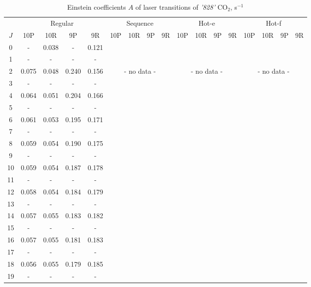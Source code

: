 \documentclass{report}
\begin{document}
\begin{appendices}
\begin{table}
\centering
\caption{Einstein coefficients $A$ of laser transitions of \textit{'828'} {CO$_2$}, s$^{-1}$}
\label{table:A828}
\scriptsize
\begin{tabular}{|c|cccc|cccc|cccc|cccc|}
\hline
& \multicolumn{4}{c|}{Regular}& \multicolumn{4}{c|}{Sequence}& \multicolumn{4}{c|}{Hot-e}& \multicolumn{4}{c|}{Hot-f}\\
$J$ & 10P & 10R & 9P & 9R & 10P & 10R & 9P & 9R & 10P & 10R & 9P & 9R & 10P & 10R & 9P & 9R\\ 
\hline
0  &   -   & 0.038 &   -   & 0.121 & & & & & & & & & & & &\\
1  &   -   &   -   &   -   &   -   & & & & & & & & & & & &\\
2  & 0.075 & 0.048 & 0.240 & 0.156 & \multicolumn{4}{c|}{- no data -}& \multicolumn{4}{c|}{- no data -}& \multicolumn{4}{c|}{- no data -}\\
3  &   -   &   -   &   -   &   -   & & & & & & & & & & & &\\
4  & 0.064 & 0.051 & 0.204 & 0.166 & & & & & & & & & & & &\\
5  &   -   &   -   &   -   &   -   & & & & & & & & & & & &\\
6  & 0.061 & 0.053 & 0.195 & 0.171 & & & & & & & & & & & &\\
7  &   -   &   -   &   -   &   -   & & & & & & & & & & & &\\
8  & 0.059 & 0.054 & 0.190 & 0.175 & & & & & & & & & & & &\\
9  &   -   &   -   &   -   &   -   & & & & & & & & & & & &\\
10 & 0.059 & 0.054 & 0.187 & 0.178 & & & & & & & & & & & &\\
11 &   -   &   -   &   -   &   -   & & & & & & & & & & & &\\
12 & 0.058 & 0.054 & 0.184 & 0.179 & & & & & & & & & & & &\\
13 &   -   &   -   &   -   &   -   & & & & & & & & & & & &\\
14 & 0.057 & 0.055 & 0.183 & 0.182 & & & & & & & & & & & &\\
15 &   -   &   -   &   -   &   -   & & & & & & & & & & & &\\
16 & 0.057 & 0.055 & 0.181 & 0.183 & & & & & & & & & & & &\\
17 &   -   &   -   &   -   &   -   & & & & & & & & & & & &\\
18 & 0.056 & 0.055 & 0.179 & 0.185 & & & & & & & & & & & &\\
19 &   -   &   -   &   -   &   -   & & & & & & & & & & & &\\

\end{tabular}
\end{table}
\end{appendices}
\end{document}
